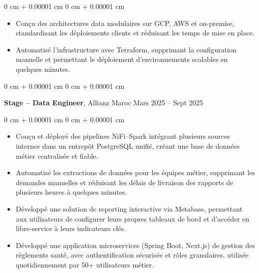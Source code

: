 \documentclass[10pt, letterpaper]{article}
\newenvironment{highlights}{
    \begin{itemize}[
        topsep=0.10 cm,
        parsep=0.10 cm,
        partopsep=0pt,
        itemsep=0pt,
        leftmargin=0 cm + 10pt
    ]
}{
    \end{itemize}
} %
\newenvironment{onecolentry}{
    \begin{adjustwidth}{
        0 cm + 0.00001 cm
    }{
        0 cm + 0.00001 cm
    }
}{
    \end{adjustwidth}
} %
\newenvironment{twocolentry}[2][]{
    \onecolentry
    \def\secondColumn{#2}
    \setcolumnwidth{\fill, 4.5 cm}
    \begin{paracol}{2}
}{
    \switchcolumn \raggedleft \secondColumn
    \end{paracol}
    \endonecolentry
} %
\begin{document}
        \vspace{0.10 cm}
        \begin{onecolentry}
            \begin{highlights}
                \item Conçu des architectures data modulaires sur GCP, AWS et on-premise, standardisant les déploiements clients et réduisant les temps de mise en place.
                \item Automatisé l’infrastructure avec Terraform, supprimant la configuration manuelle et permettant le déploiement d’environnements scalables en quelques minutes.


            \end{highlights}
        \end{onecolentry}


        \vspace{0.2 cm}
        
        \begin{twocolentry}{
            Mars 2025 – Sept 2025
        }
            \textbf{Stage – Data Engineer}, Allianz Maroc \end{twocolentry}

        \vspace{0.10 cm}
        \begin{onecolentry}
            \begin{highlights}
                \item Conçu et déployé des pipelines NiFi–Spark intégrant plusieurs sources internes dans un entrepôt PostgreSQL unifié, créant une base de données métier centralisée et fiable.
                \item Automatisé les extractions de données pour les équipes métier, supprimant les demandes manuelles et réduisant les délais de livraison des rapports de plusieurs heures à quelques minutes.
                \item Développé une solution de reporting interactive via Metabase, permettant aux utilisateurs de configurer leurs propres tableaux de bord et d’accéder en libre-service à leurs indicateurs clés.
                \item Développé une application microservices (Spring Boot, Next.js) de gestion des règlements santé, avec authentification sécurisée et rôles granulaires, utilisée quotidiennement par 50+ utilisateurs métier.

            \end{highlights}
        \end{onecolentry}
\end{document}
